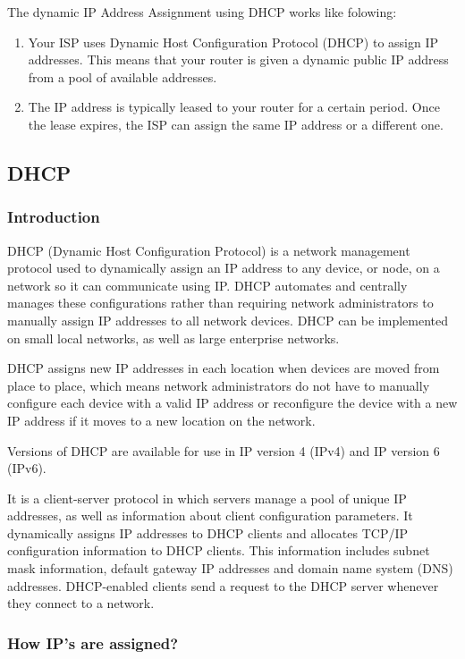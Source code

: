 \documentclass{article}
\begin{document}
The dynamic IP Address Assignment using DHCP works like folowing:

\begin{enumerate} 
    \item Your ISP uses Dynamic Host Configuration Protocol (DHCP) to assign IP addresses. This means that your router is given a dynamic public IP address from a pool of available addresses.
    \item The IP address is typically leased to your router for a certain period. Once the lease expires, the ISP can assign the same IP address or a different one.
\end{enumerate}

\subsection{DHCP}

\subsubsection{Introduction}

DHCP (Dynamic Host Configuration Protocol) is a network management protocol used to dynamically assign an IP address to any device, or node, on a network so it can communicate using IP. DHCP automates and centrally manages these configurations rather than requiring network administrators to manually assign IP addresses to all network devices. DHCP can be implemented on small local networks, as well as large enterprise networks.

DHCP assigns new IP addresses in each location when devices are moved from place to place, which means network administrators do not have to manually configure each device with a valid IP address or reconfigure the device with a new IP address if it moves to a new location on the network.

Versions of DHCP are available for use in IP version 4 (IPv4) and IP version 6 (IPv6).

It is a client-server protocol in which servers manage a pool of unique IP addresses, as well as information about client configuration parameters.  It dynamically assigns IP addresses to DHCP clients and allocates TCP/IP configuration information to DHCP clients. This information includes subnet mask information, default gateway IP addresses and domain name system (DNS) addresses. DHCP-enabled clients send a request to the DHCP server whenever they connect to a network.

\subsubsection{How IP's are assigned?}
\end{document}
